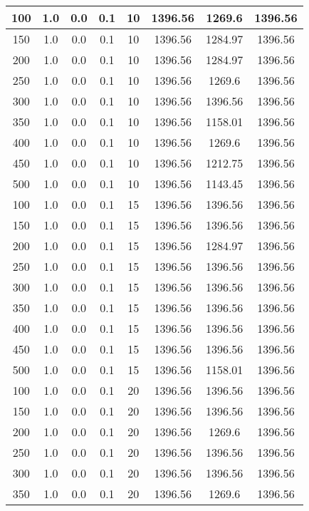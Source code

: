 \documentclass[a4paper, 12pt]{extreport}
\begin{document}
\begin{itemize}
\begin{longtable}{|c|c|c|c|c|c|c|c|}
			100 & 1.0 & 0.0 & 0.1 & 10 & 1396.56 & 1269.6 & 1396.56 \\\hline
			150 & 1.0 & 0.0 & 0.1 & 10 & 1396.56 & 1284.97 & 1396.56 \\\hline
			200 & 1.0 & 0.0 & 0.1 & 10 & 1396.56 & 1284.97 & 1396.56 \\\hline
			250 & 1.0 & 0.0 & 0.1 & 10 & 1396.56 & 1269.6 & 1396.56 \\\hline
			300 & 1.0 & 0.0 & 0.1 & 10 & 1396.56 & 1396.56 & 1396.56 \\\hline
			350 & 1.0 & 0.0 & 0.1 & 10 & 1396.56 & 1158.01 & 1396.56 \\\hline
			400 & 1.0 & 0.0 & 0.1 & 10 & 1396.56 & 1269.6 & 1396.56 \\\hline
			450 & 1.0 & 0.0 & 0.1 & 10 & 1396.56 & 1212.75 & 1396.56 \\\hline
			500 & 1.0 & 0.0 & 0.1 & 10 & 1396.56 & 1143.45 & 1396.56 \\\hline
			100 & 1.0 & 0.0 & 0.1 & 15 & 1396.56 & 1396.56 & 1396.56 \\\hline
			150 & 1.0 & 0.0 & 0.1 & 15 & 1396.56 & 1396.56 & 1396.56 \\\hline
			200 & 1.0 & 0.0 & 0.1 & 15 & 1396.56 & 1284.97 & 1396.56 \\\hline
			250 & 1.0 & 0.0 & 0.1 & 15 & 1396.56 & 1396.56 & 1396.56 \\\hline
			300 & 1.0 & 0.0 & 0.1 & 15 & 1396.56 & 1396.56 & 1396.56 \\\hline
			350 & 1.0 & 0.0 & 0.1 & 15 & 1396.56 & 1396.56 & 1396.56 \\\hline
			400 & 1.0 & 0.0 & 0.1 & 15 & 1396.56 & 1396.56 & 1396.56 \\\hline
			450 & 1.0 & 0.0 & 0.1 & 15 & 1396.56 & 1396.56 & 1396.56 \\\hline
			500 & 1.0 & 0.0 & 0.1 & 15 & 1396.56 & 1158.01 & 1396.56 \\\hline
			100 & 1.0 & 0.0 & 0.1 & 20 & 1396.56 & 1396.56 & 1396.56 \\\hline
			150 & 1.0 & 0.0 & 0.1 & 20 & 1396.56 & 1396.56 & 1396.56 \\\hline
			200 & 1.0 & 0.0 & 0.1 & 20 & 1396.56 & 1269.6 & 1396.56 \\\hline
			250 & 1.0 & 0.0 & 0.1 & 20 & 1396.56 & 1396.56 & 1396.56 \\\hline
			300 & 1.0 & 0.0 & 0.1 & 20 & 1396.56 & 1396.56 & 1396.56 \\\hline
			350 & 1.0 & 0.0 & 0.1 & 20 & 1396.56 & 1269.6 & 1396.56 \\\hline

\end{longtable}
\end{itemize}
\end{document}
